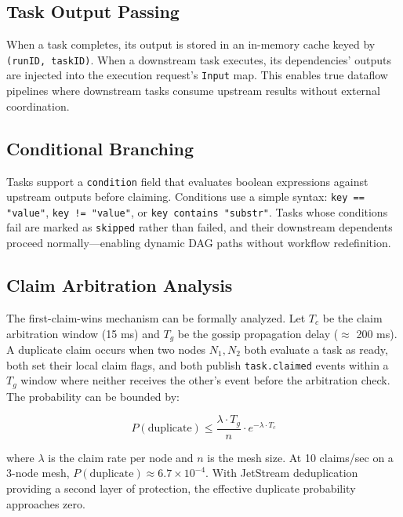 \documentclass[sigconf]{acmart}
\begin{document}
\subsection{Task Output Passing}

When a task completes, its output is stored in an in-memory cache keyed by \texttt{(runID, taskID)}. When a downstream task executes, its dependencies' outputs are injected into the execution request's \texttt{Input} map. This enables true dataflow pipelines where downstream tasks consume upstream results without external coordination.

\subsection{Conditional Branching}

Tasks support a \texttt{condition} field that evaluates boolean expressions against upstream outputs before claiming. Conditions use a simple syntax: \texttt{key == "value"}, \texttt{key != "value"}, or \texttt{key contains "substr"}. Tasks whose conditions fail are marked as \texttt{skipped} rather than failed, and their downstream dependents proceed normally---enabling dynamic DAG paths without workflow redefinition.

\subsection{Claim Arbitration Analysis}

The first-claim-wins mechanism can be formally analyzed. Let $T_c$ be the claim arbitration window (15 ms) and $T_g$ be the gossip propagation delay ($\approx$ 200 ms). A duplicate claim occurs when two nodes $N_1, N_2$ both evaluate a task as ready, both set their local claim flags, and both publish \mbox{\texttt{task.claimed}} events within a $T_g$ window where neither receives the other's event before the arbitration check. The probability can be bounded by:

\begin{equation}
P(\text{duplicate}) \leq \frac{\lambda \cdot T_g}{n} \cdot e^{-\lambda \cdot T_c}
\end{equation}

where $\lambda$ is the claim rate per node and $n$ is the mesh size. At 10 claims/sec on a 3-node mesh, $P(\text{duplicate}) \approx 6.7 \times 10^{-4}$. With JetStream deduplication providing a second layer of protection, the effective duplicate probability approaches zero.
\end{document}
